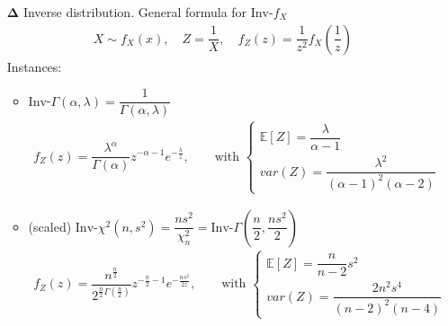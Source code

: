 \begin{itemize}[topsep=2pt,itemsep=0pt]
    
    
    \item[$ \bm{\Delta } $] Inverse distribution. General formula for $ \mathrm{Inv}$-$f_X  $
    \begin{align*}
        X\sim f_X(x),\quad Z=\dfrac{1}{X},\quad f_Z(z)=\dfrac{1}{z^2}f_X(\dfrac{1}{z}) 
    \end{align*}
    Instances:
    \begin{itemize}[topsep=2pt,itemsep=0pt]
        \item $ \mathrm{Inv}  $-$ \Gamma (\alpha ,\lambda  )= \dfrac{1}{\Gamma (\alpha ,\lambda  )}$
        \begin{align*}
            f_Z(z)=\dfrac{\lambda ^\alpha }{\Gamma (\alpha )}z^{-\alpha -1}e^{-\frac{\lambda }{z}}  ,\qquad \text{with } \begin{cases}
                \mathbb{E}\left[ Z \right] =\dfrac{\lambda }{\alpha -1}\\
                var(Z)=\dfrac{\lambda ^2}{(\alpha -1)^2(\alpha -2)} 
            \end{cases}
        \end{align*}
        \item (scaled) $ \mathrm{Inv}$-$\chi^2(n,s^2)=\dfrac{ns^2}{\chi^2_n}=\mathrm{Inv}$-$ \Gamma (\dfrac{n}{2},\dfrac{ns^2}{2}) $
        \begin{align*}
            f_Z(z)= \dfrac{n^{\frac{n}{2}}}{2^{\frac{n}{2}\Gamma (\frac{n}{2})}}z^{-\frac{n}{2}-1}e^{-\frac{ns^2}{2z}} ,\qquad \text{with }\begin{cases}
                \mathbb{E}\left[ Z \right]=\dfrac{n}{n-2}s^2\\
                 var(Z)=  \dfrac{2n^2s^4}{(n-2)^2(n-4)}
            \end{cases}
        \end{align*}
    

\end{itemize}
\end{itemize}
